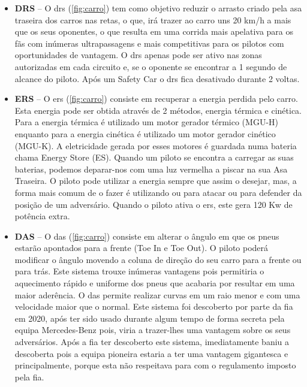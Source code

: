 \documentclass{report}
\begin{document}
\begin{itemize}
\item \textbf{DRS} – O \ac{drs} (\autoref{fig:carro}) tem como objetivo reduzir o arrasto criado pela asa traseira dos carros nas retas, o que, irá trazer ao carro uns 20 km/h a mais que os seus oponentes, o que resulta em uma corrida mais apelativa para os fãs com inúmeras ultrapassagens e mais competitivas para os pilotos com oportunidades de vantagem. O \ac{drs} apenas pode ser ativo nas zonas autorizadas em cada circuito e, se o oponente se encontrar a 1 segundo de alcance do piloto. Após um Safety Car o \ac{drs} fica desativado durante 2 voltas.

\item \textbf{ERS} – O \ac{ers} (\autoref{fig:carro}) consiste em recuperar a energia perdida pelo carro. Esta energia pode ser obtida através de 2 métodos, energia térmica e cinética. Para a energia térmica é utilizado um motor gerador térmico (MGU-H) enquanto para a energia cinética é utilizado um motor gerador cinético (MGU-K). A eletricidade gerada por esses motores é guardada numa bateria chama Energy Store (ES).
Quando um piloto se encontra a carregar as suas baterias, podemos deparar-nos com uma luz vermelha a piscar na sua Asa Traseira.
O piloto pode utilizar a energia sempre que assim o desejar, mas, a forma mais comum de o fazer é utilizando ou para atacar ou para defender da posição de um adversário. Quando o piloto ativa o \ac{ers}, este gera 120 Kw de potência extra.

\item \textbf{DAS} – O \ac{das} (\autoref{fig:carro}) consiste em alterar o ângulo em que os pneus estarão apontados para a frente (Toe In e Toe Out). O piloto poderá modificar o ângulo movendo a coluna de direção do seu carro para a frente ou para trás. Este sistema trouxe inúmeras vantagens pois permitiria o aquecimento rápido e uniforme dos pneus que acabaria por resultar em uma maior aderência. O \ac{das} permite realizar curvas em um raio menor e com uma velocidade maior que o normal.
Este sistema foi descoberto por parte da \ac{fia} em 2020, após ter sido usado durante algum tempo de forma secreta pela equipa Mercedes-Benz pois, viria a trazer-lhes uma vantagem sobre os seus adversários. Após a \ac{fia} ter descoberto este sistema, imediatamente baniu a descoberta pois a equipa pioneira estaria a ter uma vantagem gigantesca e principalmente, porque esta não respeitava para com o regulamento imposto pela \ac{fia}. \\[1cm]


\end{itemize}
\end{document}
